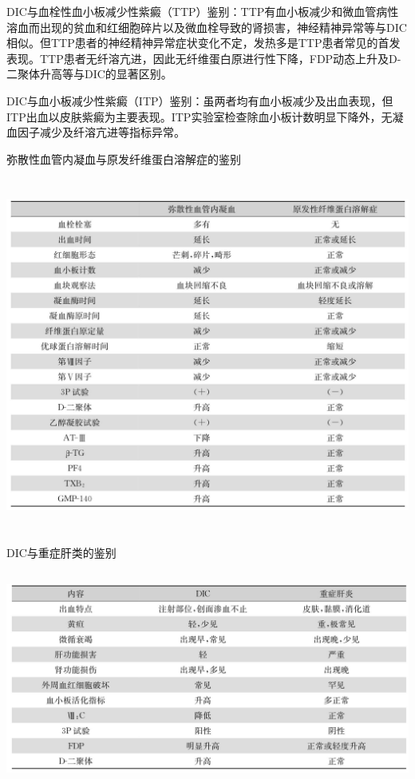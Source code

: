 DIC与血栓性血小板减少性紫癜（TTP）鉴别：TTP有血小板减少和微血管病性溶血而出现的贫血和红细胞碎片以及微血栓导致的肾损害，神经精神异常等与DIC相似。但TTP患者的神经精神异常症状变化不定，发热多是TTP患者常见的首发表现。TTP患者无纤溶亢进，因此无纤维蛋白原进行性下降，FDP动态上升及D-二聚体升高等与DIC的显著区别。

DIC与血小板减少性紫癜（ITP）鉴别：虽两者均有血小板减少及出血表现，但ITP出血以皮肤紫癜为主要表现。ITP实验室检查除血小板计数明显下降外，无凝血因子减少及纤溶亢进等指标异常。

\begin{table}[htbp]
\centering
\caption{弥散性血管内凝血与原发纤维蛋白溶解症的鉴别}
\label{tab34-13}
\includegraphics[width=5.9375in,height=4.59375in]{./images/Image00208.jpg}
\end{table}

\begin{table}[htbp]
\centering
\caption{DIC与重症肝类的鉴别}
\label{tab34-14}
\includegraphics[width=5.9375in,height=2.78125in]{./images/Image00209.jpg}
\end{table}

